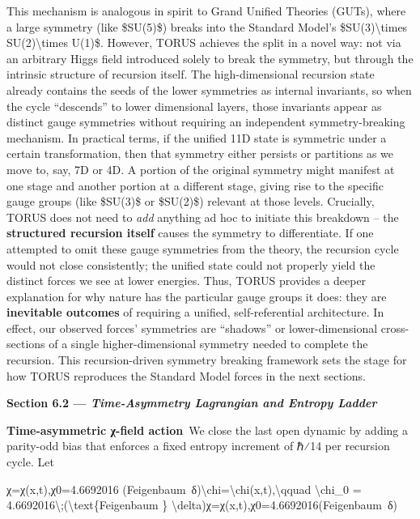 \documentclass[
]{article}
\begin{document}
This mechanism is analogous in spirit to Grand Unified Theories (GUTs),
where a large symmetry (like \$SU(5)\$) breaks into the Standard Model's
\$SU(3)\textbackslash times SU(2)\textbackslash times U(1)\$. However,
TORUS achieves the split in a novel way: not via an arbitrary Higgs
field introduced solely to break the symmetry, but through the intrinsic
structure of recursion itself\hspace{0pt}. The high-dimensional
recursion state already contains the seeds of the lower symmetries as
internal invariants, so when the cycle ``descends'' to lower dimensional
layers, those invariants appear as distinct gauge symmetries without
requiring an independent symmetry-breaking mechanism\hspace{0pt}. In
practical terms, if the unified 11D state is symmetric under a certain
transformation, then that symmetry either persists or partitions as we
move to, say, 7D or 4D. A portion of the original symmetry might
manifest at one stage and another portion at a different stage, giving
rise to the specific gauge groups (like \$SU(3)\$ or \$SU(2)\$) relevant
at those levels\hspace{0pt}. Crucially, TORUS does not need to
\emph{add} anything ad hoc to initiate this breakdown -- the
\textbf{structured recursion itself} causes the symmetry to
differentiate. If one attempted to omit these gauge symmetries from the
theory, the recursion cycle would not close consistently; the unified
state could not properly yield the distinct forces we see at lower
energies\hspace{0pt}. Thus, TORUS provides a deeper explanation for why
nature has the particular gauge groups it does: they are
\textbf{inevitable outcomes} of requiring a unified, self-referential
architecture. In effect, our observed forces' symmetries are ``shadows''
or lower-dimensional cross-sections of a single higher-dimensional
symmetry needed to complete the recursion\hspace{0pt}. This
recursion-driven symmetry breaking framework sets the stage for how
TORUS reproduces the Standard Model forces in the next sections.

\textbf{Section 6.2 --- \emph{Time-Asymmetry Lagrangian and Entropy
Ladder}}

\textbf{Time-asymmetric χ-field action} We close the last open dynamic
by adding a parity-odd bias that enforces a fixed entropy increment of
ℏ⁄14 per recursion cycle. Let

χ=χ(x,t),χ0=4.6692016  (Feigenbaum~δ)\textbackslash chi=\textbackslash chi(x,t),\textbackslash qquad
\textbackslash chi\_0 =
4.6692016\textbackslash;(\textbackslash text\{Feigenbaum \}
\textbackslash delta)χ=χ(x,t),χ0\hspace{0pt}=4.6692016(Feigenbaum~δ)
\end{document}

